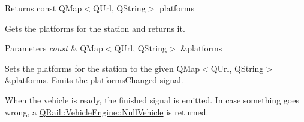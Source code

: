 \begin{DoxyReturn}{Returns}
const Q\+Map$<$\+Q\+Url, Q\+String$>$ platforms
\end{DoxyReturn}
Gets the platforms for the station and returns it.


\begin{DoxyParams}{Parameters}
{\em const} & Q\+Map$<$\+Q\+Url, Q\+String$>$ \&platforms\\
\hline
\end{DoxyParams}
Sets the platforms for the station to the given Q\+Map$<$\+Q\+Url, Q\+String$>$ \&platforms. Emits the platforms\+Changed signal.

When the vehicle is ready, the finished signal is emitted. In case something goes wrong, a \mbox{\hyperlink{classQRail_1_1VehicleEngine_1_1NullVehicle}{Q\+Rail\+::\+Vehicle\+Engine\+::\+Null\+Vehicle}} is returned. 